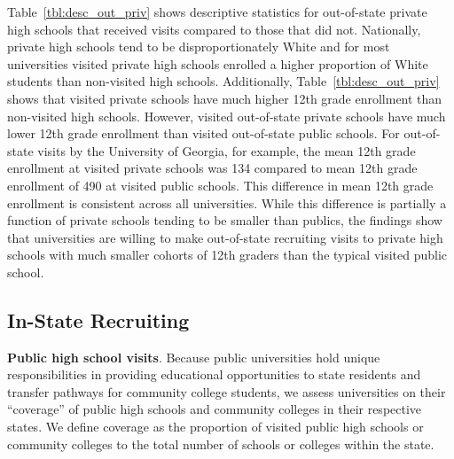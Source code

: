 \documentclass[twoside]{article}
\begin{document}
Table~\ref{tbl:desc_out_priv} shows descriptive statistics for out-of-state private high schools that received visits compared to those that did not. Nationally, private high schools tend to be disproportionately White and for most universities visited private high schools enrolled a higher proportion of White students than non-visited high schools. Additionally, Table~\ref{tbl:desc_out_priv} shows that visited private schools have much higher 12th grade enrollment than non-visited high schools. However, visited out-of-state private schools have much lower 12th grade enrollment than visited out-of-state public schools. For out-of-state visits by the University of Georgia, for example, the mean 12th grade enrollment at visited private schools was 134 compared to mean 12th grade enrollment of 490 at visited public schools. This difference in mean 12th grade enrollment is consistent across all universities. While this difference is partially a function of private schools tending to be smaller than publics, the findings show that universities are willing to make out-of-state recruiting visits to private high schools with much smaller cohorts of 12th graders than the typical visited public school.

\subsection*{In-State Recruiting}

\textbf{Public high school visits}. Because public universities hold unique responsibilities in providing educational opportunities to state residents and transfer pathways for community college students, we assess universities on their ``coverage'' of public high schools and community colleges in their respective states. We define coverage as the proportion of visited public high schools or community colleges to the total number of schools or colleges within the state.



\end{document}

